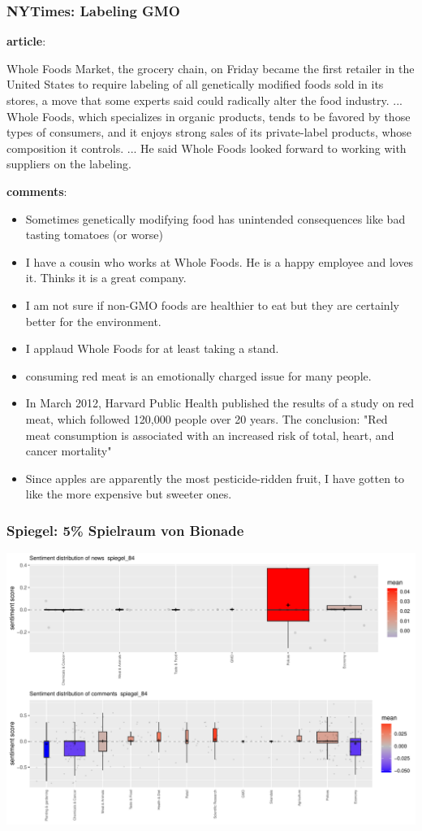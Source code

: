 \documentclass{tum-presentation}
\begin{document}
\begin{frame}
  \frametitle{NYTimes: Labeling GMO}
  \begin{description}
    \item \textbf{article}:
    \item Whole Foods Market, the grocery chain, on Friday became the first retailer in the United States to require labeling of all genetically modified foods sold in its stores, a move that some experts said could radically alter the food industry. ... Whole Foods, which specializes in organic products, tends to be favored by those types of consumers, and it enjoys strong sales of its private-label products, whose composition it controls. ... He said Whole Foods looked forward to working with suppliers on the labeling.
    \item \textbf{comments}:
    \item  \begin{itemize}
    \item Sometimes genetically modifying food has unintended consequences like bad tasting tomatoes (or worse)
    \item I have a cousin who works at Whole Foods. He is a happy employee and loves it. Thinks it is a great company.
    \item I am not sure if non-GMO foods are healthier to eat but they are certainly better for the environment.
    \item I applaud Whole Foods for at least taking a stand.
    \item consuming red meat is an emotionally charged issue for many people.
    \item In March 2012, Harvard Public Health published the results of a study on red meat, which followed 120,000 people over 20 years. The conclusion: "Red meat consumption is associated with an increased risk of total, heart, and cancer mortality"
    \item Since apples are apparently the most pesticide-ridden fruit, I have gotten to like the more expensive but sweeter ones.
  \end{itemize}
   \end{description}
\end{frame}
\begin{frame}
  \frametitle{Spiegel: 5\% Spielraum von Bionade }
  \includegraphics[width =0.65 \textwidth]{figures/boxplot_spiegel_84.pdf}
  
\end{frame}
\end{document}
